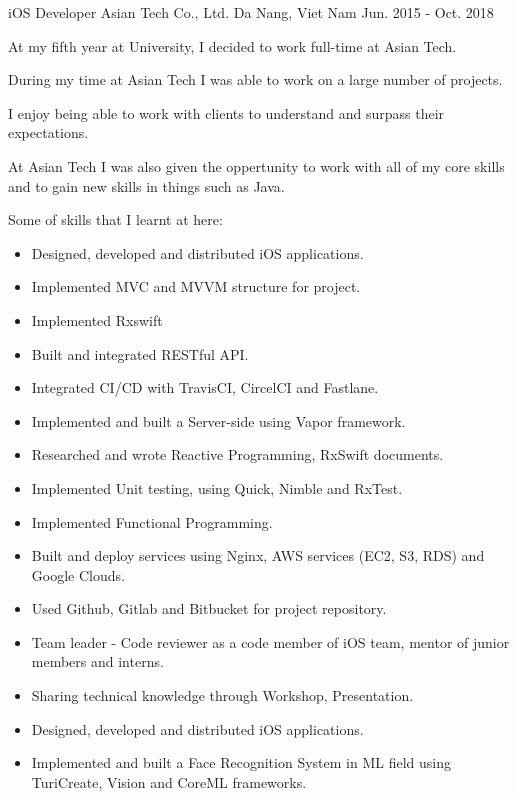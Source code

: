 \begin{cventries}
  \cventry
    {iOS Developer} %
    {Asian Tech Co., Ltd.} %
    {Da Nang, Viet Nam} %
    {Jun. 2015 - Oct. 2018} %
    {
      \begin{cvitems} %
        \item {At my fifth year at University, I decided to work full-time at Asian Tech.}
        \item {During my time at Asian Tech I was able to work on a large number of projects.}
        \item {I enjoy being able to work with clients to understand and surpass their expectations.}
        \item {At Asian Tech I was also given the oppertunity to work with all of my core skills and to gain new skills in things such as Java.}
        \item {Some of skills that I learnt at here:}
          \begin{itemize}
            \item Designed, developed and distributed iOS applications.
            \item Implemented MVC and MVVM structure for project.
            \item Implemented Rxswift
            \item Built and integrated RESTful API.
            \item Integrated CI/CD with TravisCI, CircelCI and Fastlane.
            \item Implemented and built a Server-side using Vapor framework.
            \item Researched and wrote Reactive Programming, RxSwift documents.
            \item Implemented Unit testing, using Quick, Nimble and RxTest.
            \item Implemented Functional Programming.
            \item Built and deploy services using Nginx, AWS services (EC2, S3, RDS) and Google Clouds.
            \item Used Github, Gitlab and Bitbucket for project repository.
            \item Team leader - Code reviewer as a code member of iOS team, mentor of junior members and interns.
            \item Sharing technical knowledge through Workshop, Presentation.
            \item Designed, developed and distributed iOS applications.
            \item Implemented and built a Face Recognition System in ML field using TuriCreate, Vision and CoreML frameworks.
          \end{itemize}
      \end{cvitems}
    }


\end{cventries}
